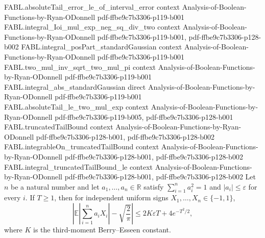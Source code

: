 \begin{theorem}
\proofstep
  {FABL.absoluteTail_error_le_of_interval_error}
  {context}
  {Analysis-of-Boolean-Functions-by-Ryan-ODonnell}
  {pdf-ffbe9c7b3306-p119-b001}
\proofstep
  {FABL.integral_Ioi_mul_exp_neg_sq_div_two}
  {context}
  {Analysis-of-Boolean-Functions-by-Ryan-ODonnell}
  {pdf-ffbe9c7b3306-p119-b001,
    pdf-ffbe9c7b3306-p128-b002}
\proofstep
  {FABL.integral_posPart_standardGaussian}
  {context}
  {Analysis-of-Boolean-Functions-by-Ryan-ODonnell}
  {pdf-ffbe9c7b3306-p119-b001}
\proofstep
  {FABL.two_mul_inv_sqrt_two_mul_pi}
  {context}
  {Analysis-of-Boolean-Functions-by-Ryan-ODonnell}
  {pdf-ffbe9c7b3306-p119-b001}
\proofstep
  {FABL.integral_abs_standardGaussian}
  {direct}
  {Analysis-of-Boolean-Functions-by-Ryan-ODonnell}
  {pdf-ffbe9c7b3306-p119-b001}
\proofstep
  {FABL.absoluteTail_le_two_mul_exp}
  {context}
  {Analysis-of-Boolean-Functions-by-Ryan-ODonnell}
  {pdf-ffbe9c7b3306-p119-b005,
    pdf-ffbe9c7b3306-p128-b001}
\proofstep
  {FABL.truncatedTailBound}
  {context}
  {Analysis-of-Boolean-Functions-by-Ryan-ODonnell}
  {pdf-ffbe9c7b3306-p128-b001,
    pdf-ffbe9c7b3306-p128-b002}
\proofstep
  {FABL.integrableOn_truncatedTailBound}
  {context}
  {Analysis-of-Boolean-Functions-by-Ryan-ODonnell}
  {pdf-ffbe9c7b3306-p128-b001,
    pdf-ffbe9c7b3306-p128-b002}
\proofstep
  {FABL.integral_truncatedTailBound_le}
  {context}
  {Analysis-of-Boolean-Functions-by-Ryan-ODonnell}
  {pdf-ffbe9c7b3306-p128-b001,
    pdf-ffbe9c7b3306-p128-b002}
Let $n$ be a natural number and let $a_1,\dots,a_n\in\mathbb R$ satisfy $\sum_{i=1}^n
a_i^2=1$ and $|a_i|\le\varepsilon$ for every $i$. If $T\ge1$, then for independent
uniform signs $X_1,\dots,X_n\in\{-1,1\}$,
\[
\left|\mathbb E\left|\sum_{i=1}^n a_iX_i\right|-\sqrt{\frac{2}{\pi}}\right|\le
2K\varepsilon T+4e^{-T^2/2},
\]
where $K$ is the third-moment Berry–Esseen constant.
\end{theorem}

